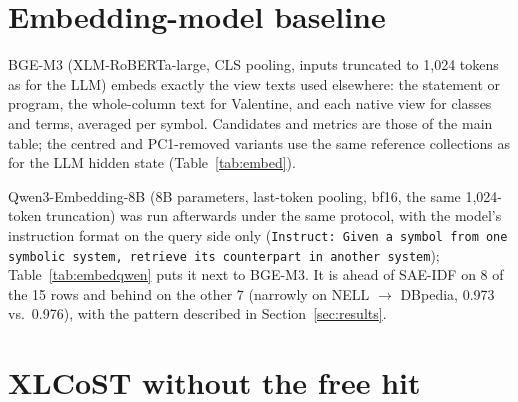 \documentclass[11pt]{article}
\newcommand{\method}{SAE\mbox{-}IDF\xspace}
\begin{document}
\section{Embedding-model baseline}
\label{app:embed}

BGE-M3 \citep{chen2024bge} (XLM-RoBERTa-large, CLS pooling, inputs truncated to 1,024 tokens as for the LLM) embeds exactly the view texts used elsewhere: the statement or program, the whole-column text for Valentine, and each native view for classes and terms, averaged per symbol.
Candidates and metrics are those of the main table; the centred and PC1-removed variants use the same reference collections as for the LLM hidden state (Table~\ref{tab:embed}).

\begin{table}[H]
  \centering\scriptsize
  
  \caption{An off-the-shelf retriever against \method. Bold: best of the five model-based columns. The retriever leads on Lean~4 $\to$ Metamath, $\to$ HOL Light, Valentine and NELL $\to$ DBpedia; \method leads on the other rows, the three biomedical ones included.}
  \label{tab:embed}
\end{table}

Qwen3-Embedding-8B \citep{zhang2025qwen3embedding} (8B parameters, last-token pooling, bf16, the same 1,024-token truncation) was run afterwards under the same protocol, with the model's instruction format on the query side only (\texttt{Instruct: Given a symbol from one symbolic system, retrieve its counterpart in another system}); Table~\ref{tab:embedqwen} puts it next to BGE-M3.
It is ahead of \method on 8 of the 15 rows and behind on the other 7 (narrowly on NELL $\to$ DBpedia, 0.973 vs.\ 0.976), with the pattern described in Section~\ref{sec:results}.

\begin{table}[H]
  \centering\scriptsize
  
  \caption{A second, larger retriever. Bold: best per row. Against \method, Qwen3-Embedding-8B is ahead on the formal-mathematics pairs, Valentine, MultiFarm Chinese and Russian and Anatomy, and behind on XLCoST, both knowledge-graph pairs, MultiFarm Arabic and both Bio-ML splits.}
  \label{tab:embedqwen}
\end{table}

\section{XLCoST without the free hit}
\label{app:exclude}
\end{document}
